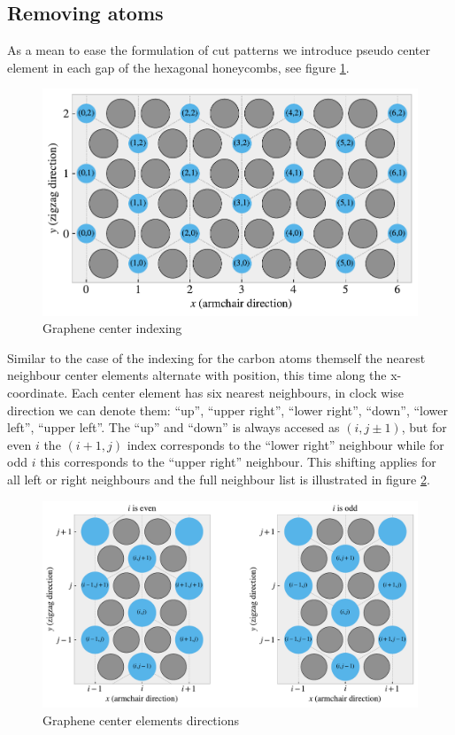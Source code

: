 \subsection{Removing atoms}

As a mean to ease the formulation of cut patterns we introduce pseudo center
element in each gap of the hexagonal honeycombs, see figure
\ref{fig:center_indexing}. 

\begin{figure}[H]
  \centering
  \includegraphics[width=0.7\linewidth]{figures/system/center_indexing.pdf}
  \caption{Graphene center indexing}
  \label{fig:center_indexing}
\end{figure}




Similar to the case of the indexing for the carbon atoms themself the nearest
neighbour center elements alternate with position, this time along the
x-coordinate. Each center element has six nearest neighbours, in clock wise
direction we can denote them: ``up'', ``upper right'', ``lower right'',
``down'', ``lower left'', ``upper left''. The ``up'' and ``down'' is always
accesed as $(i,j\pm 1)$, but for even $i$ the $(i+1,j)$ index corresponds to the
``lower right'' neighbour while for odd $i$ this corresponds to the ``upper
right'' neighbour. This shifting applies for all left or right neighbours and
the full neighbour list is illustrated in figure \ref{fig:center_directions}. 


\begin{figure}[H]
  \centering
  \includegraphics[width=0.7\linewidth]{figures/system/center_directions.pdf}
  \caption{Graphene center elements directions}
  \label{fig:center_directions}
\end{figure}


